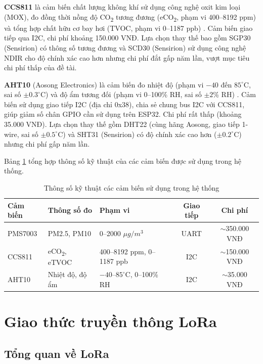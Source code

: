 \documentclass[../DoAn.tex]{subfiles}
\begin{document}
\textbf{CCS811} là cảm biến chất lượng không khí sử dụng công nghệ oxit kim loại (MOX), đo đồng thời nồng độ CO\textsubscript{2} tương đương (eCO\textsubscript{2}, phạm vi 400--8192 ppm) và tổng hợp chất hữu cơ bay hơi (\gls{TVOC}, phạm vi 0--1187 ppb) \cite{ams2023}. Cảm biến giao tiếp qua I2C, chi phí khoảng 150.000 VNĐ. Lựa chọn thay thế bao gồm SGP30 (Sensirion) có thông số tương đương và SCD30 (Sensirion) sử dụng công nghệ NDIR cho độ chính xác cao hơn nhưng chi phí đắt gấp năm lần, vượt mục tiêu chi phí thấp của đề tài.

\textbf{AHT10} (Aosong Electronics) là cảm biến đo nhiệt độ (phạm vi $-40$ đến $85^{\circ}$C, sai số $\pm 0.3^{\circ}$C) và độ ẩm tương đối (phạm vi 0--100\% RH, sai số $\pm 2$\% RH) \cite{aosong2023}. Cảm biến sử dụng giao tiếp I2C (địa chỉ 0x38), chia sẻ chung bus I2C với CCS811, giúp giảm số chân GPIO cần sử dụng trên ESP32. Chi phí rất thấp (khoảng 35.000 VNĐ). Lựa chọn thay thế gồm DHT22 (cùng hãng Aosong, giao tiếp 1-wire, sai số $\pm 0.5^{\circ}$C) và SHT31 (Sensirion) có độ chính xác cao hơn ($\pm 0.2^{\circ}$C) nhưng chi phí gấp năm lần.

Bảng \ref{table:so_sanh_cam_bien} tổng hợp thông số kỹ thuật của các cảm biến được sử dụng trong hệ thống.

\begin{table}[H]
\centering
\caption{Thông số kỹ thuật các cảm biến sử dụng trong hệ thống}
\label{table:so_sanh_cam_bien}
\small
\begin{tabularx}{\textwidth}{|X|X|X|c|c|}
\hline
\textbf{Cảm biến} & \textbf{Thông số đo} & \textbf{Phạm vi} & \textbf{Giao tiếp} & \textbf{Chi phí} \\
\hline
PMS7003 & PM2.5, PM10 & 0--2000 $\mu g/m^3$ & UART & $\sim$350.000 VNĐ \\
\hline
CCS811 & eCO\textsubscript{2}, eTVOC & 400--8192 ppm, 0--1187 ppb & I2C & $\sim$150.000 VNĐ \\
\hline
AHT10 & Nhiệt độ, độ ẩm & $-40$--$85^{\circ}$C, 0--100\% RH & I2C & $\sim$35.000 VNĐ \\
\hline
\end{tabularx}
\end{table}

\section{Giao thức truyền thông LoRa}
\label{section:3.3}

\subsection{Tổng quan về LoRa}
\label{subsection:3.3.1}
\end{document}
